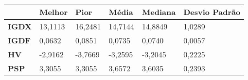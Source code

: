 \begin{table}[!ht]
    \centering
    \begin{tabular}{|l|l|l|l|l|l|}
    \hline
        \textbf{} & \textbf{Melhor} & \textbf{Pior} & \textbf{Média } & \textbf{Mediana } & \textbf{Desvio Padrão} \\ \hline
        \textbf{IGDX} & 13,1113 & 16,2481 & 14,7144 & 14,8849 & 1,0289 \\ \hline
        \textbf{IGDF} & 0,0632 & 0,0851 & 0,0735 & 0,0740 & 0,0057 \\ \hline
        \textbf{HV} & -2,9162 & -3,7669 & -3,2595 & -3,2045 & 0,2225 \\ \hline
        \textbf{PSP} & 3,3055 & 3,3055 & 3,6572 & 3,6035 & 0,2393 \\ \hline
    \end{tabular}
    \label{Tabela estatisticas 100 interações}
\end{table}